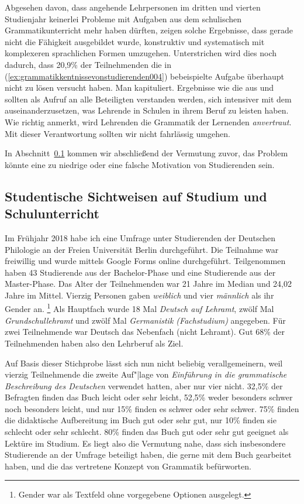 Abgesehen davon, dass angehende Lehrpersonen im dritten und vierten Studienjahr keinerlei Probleme mit Aufgaben aus dem schulischen Grammatikunterricht mehr haben dürften, zeigen solche Ergebnisse, dass gerade nicht die Fähigkeit ausgebildet wurde, konstruktiv und systematisch mit komplexeren sprachlichen Formen umzugehen.
Unterstrichen wird dies noch dadurch, dass 20,9\% der Teilnehmenden die in (\ref{ex:grammatikkentnissevonstudierenden004}) bebeispielte Aufgabe überhaupt nicht zu lösen versucht haben.
Man kapituliert.
Ergebnisse wie die aus \citet{TopalovicDuenschede2014} und \citet{SchaeferSayatz2017a} sollten als Aufruf an alle Beteiligten verstanden werden, sich intensiver mit dem auseinanderzusetzen, was Lehrende in Schulen in ihrem Beruf zu leisten haben.
Wie \citet[7]{Eisenberg2013c} richtig anmerkt, wird Lehrenden die Grammatik der Lernenden \textit{anvertraut}.
Mit dieser Verantwortung sollten wir nicht fahrlässig umgehen.

In Abschnitt~\ref{sec:studentischesichtweisenaufstudiumundschulunterricht} kommen wir abschließend der Vermutung zuvor, das Problem könnte eine zu niedrige oder eine falsche Motivation von Studierenden sein.


\subsection{Studentische Sichtweisen auf Studium und Schulunterricht}
\label{sec:studentischesichtweisenaufstudiumundschulunterricht}

Im Frühjahr 2018 habe ich eine Umfrage unter Studierenden der Deutschen Philologie an der Freien Universität Berlin durchgeführt.
Die Teilnahme war freiwillig und wurde mittels Google Forms online durchgeführt.
Teilgenommen haben 43 Studierende aus der Bachelor-Phase und eine Studierende aus der Master-Phase.
Das Alter der Teilnehmenden war 21 Jahre im Median und 24,02 Jahre im Mittel.
Vierzig Personen gaben \textit{weiblich} und vier \textit{männlich} als ihr Gender an.%
\footnote{Gender war als Textfeld ohne vorgegebene Optionen ausgelegt.}
Als Hauptfach wurde 18 Mal \textit{Deutsch auf Lehramt}, zwölf Mal \textit{Grundschullehramt} und zwölf Mal \textit{Germanistik (Fachstudium)} angegeben.
Für zwei Teilnehmende war Deutsch das Nebenfach (nicht Lehramt).
Gut 68\% der Teilnehmenden haben also den Lehrberuf als Ziel.

Auf Basis dieser Stichprobe lässt sich nun nicht beliebig verallgemeinern, weil vierzig Teilnehmende die zweite Auf"|lage von \textit{Einführung in die grammatische Beschreibung des Deutschen} verwendet hatten, aber nur vier nicht.
32,5\% der Befragten finden das Buch leicht oder sehr leicht, 52,5\% weder besonders schwer noch besonders leicht, und nur 15\% finden es schwer oder sehr schwer.
75\% finden die didaktische Aufbereitung im Buch gut oder sehr gut, nur 10\% finden sie schlecht oder sehr schlecht.
80\% finden das Buch gut oder sehr gut geeignet als Lektüre im Studium.
Es liegt also die Vermutung nahe, dass sich insbesondere Studierende an der Umfrage beteiligt haben, die gerne mit dem Buch gearbeitet haben, und die das vertretene Konzept von Grammatik befürworten.

